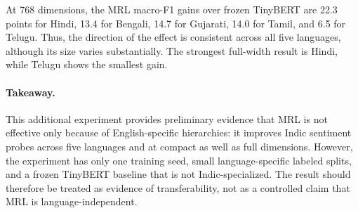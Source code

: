 At 768 dimensions, the MRL macro-F1 gains over frozen TinyBERT are
22.3 points for Hindi, 13.4 for Bengali, 14.7 for Gujarati, 14.0 for Tamil,
and 6.5 for Telugu.  Thus, the direction of the effect is consistent across
all five languages, although its size varies substantially.  The strongest
full-width result is Hindi, while Telugu shows the smallest gain.

\paragraph{Takeaway.}
This additional experiment provides preliminary evidence that MRL is not
effective only because of English-specific hierarchies: it improves Indic
sentiment probes across five languages and at compact as well as full
dimensions.  However, the experiment has only one training seed, small
language-specific labeled splits, and a frozen TinyBERT baseline that is not
Indic-specialized.  The result should therefore be treated as evidence of
transferability, not as a controlled claim that MRL is language-independent.
